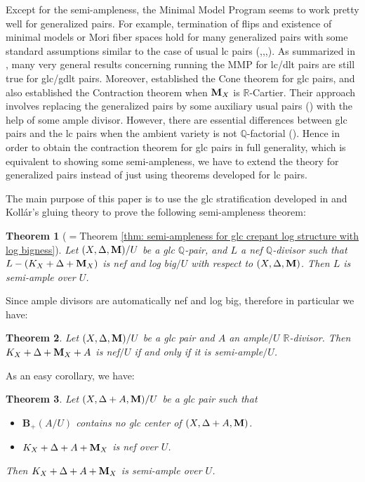 \documentclass[11pt]{amsart}
\numberwithin{equation}{section}
\newcommand{\Mm}{{\bf{M}}}
\newcommand{\Qq}{\mathbb{Q}}
\newcommand{\Rr}{\mathbb{R}}
\newtheorem{thm}{Theorem}[section]
\theoremstyle{definition}
\theoremstyle{definition}
\theoremstyle{definition}
\begin{document}
Except for the semi-ampleness, the Minimal Model Program seems to work pretty well for generalized pairs. For example, termination of flips and existence of minimal models or Mori fiber spaces hold for many generalized pairs with some standard assumptions similar to the case of usual lc pairs (\cite[Theorem 4.1]{HL22},\cite[Theorem 1.1]{LT22},\cite[Theorem 3.17]{Has22},\cite[Theorem 1.2, 1.3]{LX22a}). As summarized in \cite{HL21a}, many very general results concerning running the MMP for lc/dlt pairs are still true for glc/gdlt pairs. Moreover, \cite{HL21a} established the Cone theorem for glc pairs, and also established the Contraction theorem when $\Mm_X$ is $\Rr$-Cartier. Their approach involves replacing the generalized pairs by some auxiliary usual pairs (\cite[Theorem 4.1]{HL21a}) with the help of some ample divisor. However, there are essential differences between glc pairs and the lc pairs when the ambient variety is not $\Qq$-factorial (\cite[Example 2.1]{LX22b}). Hence in order to obtain the contraction theorem for glc pairs in full generality, which is equivalent to showing some semi-ampleness, we have to extend the theory for generalized pairs instead of just using theorems developed for lc pairs.

The main purpose of this paper is to use the glc stratification developed in \cite{LX22b} and Koll\'ar's gluing theory to prove the following semi-ampleness theorem: 

\begin{thm}[$=$Theorem \ref{thm: semi-ampleness for glc crepant log structure with log bigness}]\label{thm: main thm 1.1}
Let $(X,\Delta,\Mm)/U$ be a glc $\Qq$-pair, and $L$ a nef $\Qq$-divisor such that $L-(K_X+\Delta+\Mm_X)$ is nef and log big$/U$ with respect to $(X,\Delta,\Mm)$. Then $L$ is semi-ample over $U$. 
\end{thm}

Since ample divisors are automatically nef and log big, therefore in particular we have: 

\begin{thm}\label{thm: K_X+B+M+A is semi-ample for A ample}
Let $(X,\Delta,\Mm)/U$ be a glc pair and $A$ an ample$/U$ $\Rr$-divisor. Then $K_X+\Delta+\Mm_X+A$ is nef$/U$ if and only if it is semi-ample$/U$. 
\end{thm}

As an easy corollary, we have:
\begin{thm}\label{thm: semi-ampleness with good B+(A)}
Let $(X,\Delta+A,\Mm)/U$ be a glc pair such that 
\begin{itemize}
    \item $\mathbf{B}_+(A/U)$ contains no glc center of $(X,\Delta+A,\Mm)$.
    \item $K_X+\Delta+A+\Mm_X$ is nef over $U$.
\end{itemize}
Then $K_X+\Delta+A+\Mm_X$ is semi-ample over $U$.
\end{thm}
\end{document}
